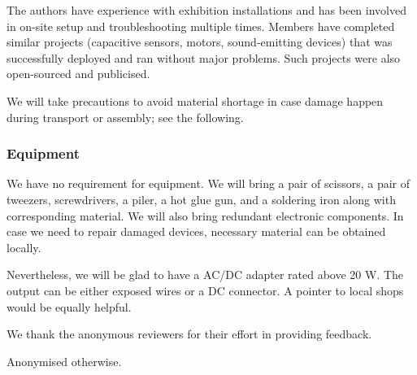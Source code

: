 \documentclass{nimemusic}
\begin{document}
The authors have experience with exhibition installations and has been involved in on-site setup and troubleshooting multiple times. Members have completed similar projects (capacitive sensors, motors, sound-emitting devices) that was successfully deployed and ran without major problems. Such projects were also open-sourced and publicised.

We will take precautions to avoid material shortage in case damage happen during transport or assembly; see the following.

\subsubsection{Equipment}
We have no requirement for equipment. We will bring a pair of scissors, a pair of tweezers, screwdrivers, a piler, a hot glue gun, and a soldering iron along with corresponding material. We will also bring redundant electronic components. In case we need to repair damaged devices, necessary material can be obtained locally.

Nevertheless, we will be glad to have a AC/DC adapter rated above 20 W. The output can be either exposed wires or a DC connector. A pointer to local shops would be equally helpful.

\begin{acks}
We thank the anonymous reviewers for their effort in providing feedback.

Anonymised otherwise.
\end{acks}

% 
% 
\end{document}

